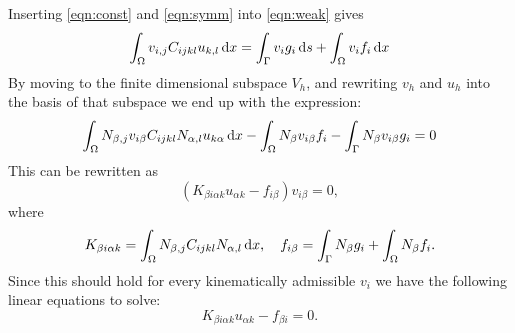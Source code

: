 \documentclass[fem.tex]{subfiles}
\begin{document}
%
Inserting \ref{eqn:const} and \ref{eqn:symm} into \ref{eqn:weak} gives
%
\begin{equation} 
  \int_\Omega  v_{i,j} C_{ijkl} u_{k,l} \, \mathrm{d} x = \int_\Gamma v_i g_i \, \mathrm{d} s + \int_\Omega v_i f_i \, \mathrm{d} x
    \label{eqn:weak_2}
\end{equation}
%
By moving to the finite dimensional subspace $V_h$, and rewriting $v_h$ and $u_h$ into the basis of that subspace we end up with the expression:
%
\begin{equation} 
\int_\Omega  N_{\beta,j}v_{i\beta}   C_{ijkl} N_{\alpha,l} u_{k\alpha} \, \mathrm{d} x -\int_\Omega N_\beta v_{i\beta} f_i - \int_\Gamma N_\beta v_{i\beta} g_i = 0
\end{equation}
This can be rewritten as
\begin{equation} 
\left( K_{\beta i \alpha k}u_{\alpha k} - f_{i \beta} \right) v_{i\beta} = 0,
\end{equation}
where
\begin{equation} 
K_{\beta i \alpha k} = \int_\Omega  N_{\beta,j}C_{ijkl}N_{\alpha,l}  \, \mathrm{d} x , \quad f_{i \beta} = \int_\Gamma N_\beta g_i + \int_\Omega N_\beta f_i.
\end{equation}
Since this should hold for every kinematically admissible $v_i$ we have the following linear equations to solve:
\begin{equation} 
K_{\beta i \alpha k}u_{\alpha k} - f_{\beta i} = 0.
\end{equation}
\end{document}
